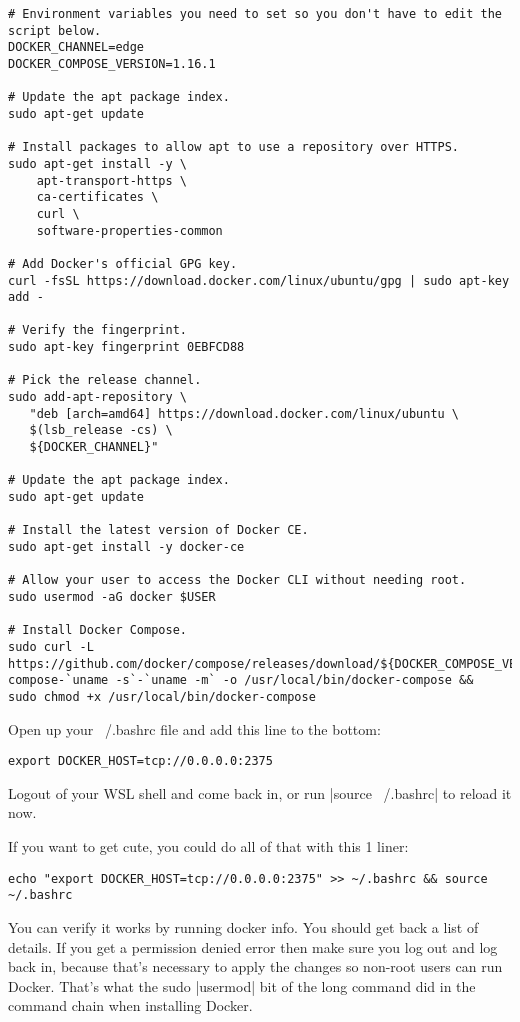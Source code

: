 \begin{verbatim}
# Environment variables you need to set so you don't have to edit the script below.
DOCKER_CHANNEL=edge
DOCKER_COMPOSE_VERSION=1.16.1

# Update the apt package index.
sudo apt-get update

# Install packages to allow apt to use a repository over HTTPS.
sudo apt-get install -y \
    apt-transport-https \
    ca-certificates \
    curl \
    software-properties-common

# Add Docker's official GPG key.
curl -fsSL https://download.docker.com/linux/ubuntu/gpg | sudo apt-key add -

# Verify the fingerprint.
sudo apt-key fingerprint 0EBFCD88

# Pick the release channel.
sudo add-apt-repository \
   "deb [arch=amd64] https://download.docker.com/linux/ubuntu \
   $(lsb_release -cs) \
   ${DOCKER_CHANNEL}"

# Update the apt package index.
sudo apt-get update

# Install the latest version of Docker CE.
sudo apt-get install -y docker-ce

# Allow your user to access the Docker CLI without needing root.
sudo usermod -aG docker $USER

# Install Docker Compose.
sudo curl -L https://github.com/docker/compose/releases/download/${DOCKER_COMPOSE_VERSION}/docker-compose-`uname -s`-`uname -m` -o /usr/local/bin/docker-compose &&
sudo chmod +x /usr/local/bin/docker-compose
\end{verbatim}

Open up your ~/.bashrc file and add this line to the bottom:

\begin{verbatim}
export DOCKER_HOST=tcp://0.0.0.0:2375
\end{verbatim}

Logout of your WSL shell and come back in, or run |source ~/.bashrc| to reload it now.

If you want to get cute, you could do all of that with this 1 liner:

\begin{verbatim}
echo "export DOCKER_HOST=tcp://0.0.0.0:2375" >> ~/.bashrc && source ~/.bashrc
\end{verbatim}

You can verify it works by running docker info. You should get back a list of details. If you get a permission denied error then make sure you log out and log back in, because that’s necessary to apply the changes so non-root users can run Docker. That’s what the sudo |usermod| bit of the long command did in the command chain when installing Docker.

